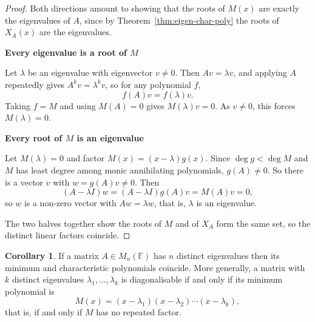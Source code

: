 \documentclass[11pt,a4paper]{article}
\theoremstyle{definition}
\newtheorem{coro}[thm]{Corollary}
\newcommand{\subhead}[1]{%
  \par\medskip\noindent\textbf{#1}\par\nobreak\smallskip}
\begin{document}
\begin{proof}
Both directions amount to showing that the roots of $M(x)$ are exactly the
eigenvalues of $A$, since by Theorem~\ref{thm:eigen-char-poly} the roots of
$X_A(x)$ are the eigenvalues.

\subhead{Every eigenvalue is a root of $M$}
Let $\lambda$ be an eigenvalue with eigenvector $v\neq 0$. Then $Av=\lambda v$,
and applying $A$ repeatedly gives $A^kv=\lambda^kv$, so for any polynomial $f$,
$$f(A)v=f(\lambda)v.$$
Taking $f=M$ and using $M(A)=0$ gives $M(\lambda)v=0$. As $v\neq 0$, this
forces $M(\lambda)=0$.

\subhead{Every root of $M$ is an eigenvalue}
Let $M(\lambda)=0$ and factor $M(x)=(x-\lambda)g(x)$. Since $\deg g<\deg M$ and
$M$ has least degree among monic annihilating polynomials, $g(A)\neq 0$. So
there is a vector $v$ with $w=g(A)v\neq 0$. Then
$$(A-\lambda I)w=(A-\lambda I)g(A)v=M(A)v=0,$$
so $w$ is a non-zero vector with $Aw=\lambda w$, that is, $\lambda$ is an
eigenvalue.

The two halves together show the roots of $M$ and of $X_A$ form the same set,
so the distinct linear factors coincide.
\end{proof}


\begin{coro}\label{coro:min-poly-diagonalisable}
If a matrix $A\in M_n(\mathbb{F})$ has $n$ distinct eigenvalues then its minimum
and characteristic polynomials coincide. More generally, a matrix with $k$
distinct eigenvalues $\lambda_1,\dots,\lambda_k$ is diagonalisable if and only
if its minimum polynomial is
$$M(x)=(x-\lambda_1)(x-\lambda_2)\cdots(x-\lambda_k),$$
that is, if and only if $M$ has no repeated factor.
\end{coro}
\end{document}
